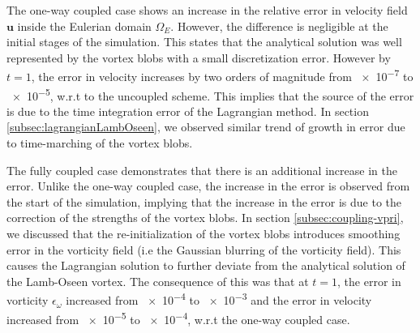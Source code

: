 The one-way coupled case shows an increase in the relative error in velocity field $\mathbf{u}$ inside the Eulerian domain $\Omega_E$. However, the difference is negligible at the initial stages of the simulation. This states that the analytical solution was well represented by the vortex blobs with a small discretization error. However by $t=1$, the error in velocity increases by two orders of magnitude from \num{e-7} to \num{e-5}, w.r.t to the uncoupled scheme. This implies that the source of the error is due to the time integration error of the Lagrangian method. In section \ref{subsec:lagrangianLambOseen}, we observed similar trend of growth in error due to time-marching of the vortex blobs.

The fully coupled case demonstrates that there is an additional increase in the error. Unlike the one-way coupled case, the increase in the error is observed from the start of the simulation, implying that the increase in the error is due to the correction of the strengths of the vortex blobs. In section \ref{subsec:coupling-vpri}, we discussed that the re-initialization of the vortex blobs introduces smoothing error in the vorticity field (i.e the Gaussian blurring of the vorticity field). This causes the Lagrangian solution to further deviate from the analytical solution of the Lamb-Oseen vortex. The consequence of this was that at $t=1$, the error in vorticity $\epsilon_{\omega}$ increased from \num{e-4} to \num{e-3} and the error in velocity increased from \num{e-5} to \num{e-4}, w.r.t the one-way coupled case.

